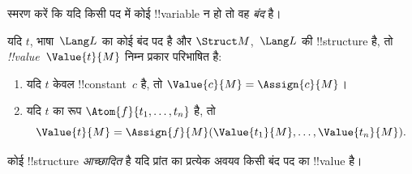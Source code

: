 \documentclass[../../../include/open-logic-section]{subfiles}
\begin{document}


\begin{explain}
स्मरण करें कि यदि किसी पद में कोई !!{variable} न हो तो वह \emph{बंद} है।
\end{explain}

\begin{defn}[बंद पदों का !!^{value}]
यदि $t$, भाषा~$\Lang L$ का कोई बंद पद है और $\Struct M$,~$\Lang L$ की
!!{structure} है, तो \emph{!!{value}}~$\Value{t}{M}$ निम्न प्रकार परिभाषित
है:
\begin{enumerate}
\item यदि $t$ केवल !!{constant}~$c$ है, तो $\Value{c}{M} = \Assign{c}{M}$।
\item यदि $t$ का रूप $\Atom{f}{t_1, \ldots, t_n}$ है, तो
  \[
  \Value{t}{M} = \Assign{f}{M}(\Value{t_1}{M}, \ldots,
  \Value{t_n}{M}).
  \]
\end{enumerate}
\end{defn}

\begin{defn}[आच्छादित !!{structure}]
कोई !!{structure} \emph{आच्छादित} है यदि प्रांत का प्रत्येक अवयव किसी बंद
पद का !!{value} है।
\end{defn}
\end{document}
